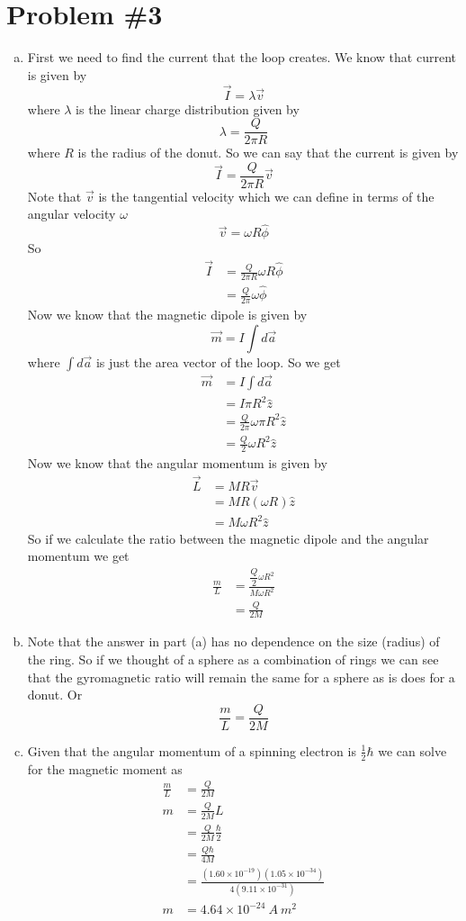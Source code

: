 \documentclass[11pt]{article}
\numberwithin{equation}{section}
\begin{document}
\section{Problem \#3}
\begin{enumerate}[(a)]
\item
First we need to find the current that the loop creates. We know that current is given by
$$\vec{I} = \lambda\vec{v}$$
where $\lambda$ is the linear charge distribution given by
$$\lambda = \frac{Q}{2\pi R}$$
where $R$ is the radius of the donut. So we can say that the current is given by
$$\vec{I} = \frac{Q}{2\pi R}\vec{v}$$
Note that $\vec{v}$ is the tangential velocity which we can define in terms of the angular velocity $\omega$
$$\vec{v} = \omega R\hat{\phi}$$
So
\begin{align*}
\vec{I} &= \frac{Q}{2\pi R}\omega R\hat{\phi}\\
&= \frac{Q}{2\pi }\omega \hat{\phi}
\end{align*}
Now we know that the magnetic dipole is given by
$$\vec{m} = I \int d\vec{a}$$
where $\int d\vec{a}$ is just the area vector of the loop. So we get
\begin{align*}
\vec{m} &= I \int d\vec{a}\\
&= I \pi R^2\hat{z}\\
&= \frac{Q}{2\pi }\omega \pi R^2\hat{z}\\
&= \frac{Q}{2}\omega R^2\hat{z}
\end{align*}
Now we know that the angular momentum is given by 
\begin{align*}
\vec{L} &= MR\vec{v}\\
&= MR(\omega R)\hat{z}\\
&= M\omega R^2\hat{z}
\end{align*}
So if we calculate the ratio between the magnetic dipole and the angular momentum we get
\begin{align*}
\frac{m}{L} &= \frac{\dfrac{Q}{2}\omega R^2}{M\omega R^2}\\
&= \frac{Q}{2M}
\end{align*}

\item
Note that the answer in part (a) has no dependence on the size (radius) of the ring. So if we thought of a sphere as a combination of rings we can see that the gyromagnetic ratio will remain the same for a sphere as is does for a donut. Or
$$\frac{m}{L} = \frac{Q}{2M}$$

\item
Given that the angular momentum of a spinning electron is $\frac{1}{2}\hbar$ we can solve for the magnetic moment as
\begin{align*}
\frac{m}{L} &= \frac{Q}{2M}\\
m &= \frac{Q}{2M}L\\
&= \frac{Q}{2M}\frac{\hbar}{2}\\
&= \frac{Q\hbar}{4M}\\
&= \frac{(1.60\times10^{-19})(1.05\times10^{-34})}{4(9.11\times10^{-31})}\\
m &= 4.64\times10^{-24}\ A\ m^2
\end{align*}

\end{enumerate}
\end{document}
